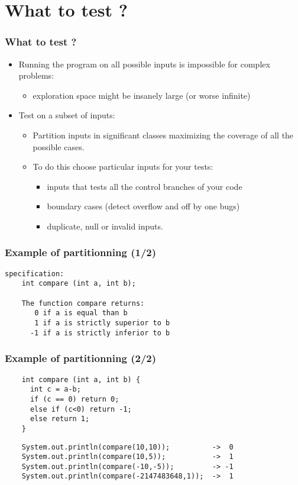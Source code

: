 \documentclass[10pt]{beamer}
\begin{document}
\section{What to test ?}
\begin{frame}
  \frametitle{What to test ?}
  \begin{itemize}
    \item Running the program on all possible inputs is impossible for complex
      problems:
      \begin{itemize}
      \item exploration space might be insanely large (or worse infinite)
      \end{itemize}
    \item Test on a subset of inputs:
      \begin{itemize}
      \item Partition inputs in significant classes maximizing the coverage of all the possible cases.
      \item To do this choose particular inputs for your tests:
        \begin{itemize}
          \item inputs that tests all the control branches of your code
          \item boundary cases (detect overflow and off by one bugs)
          \item duplicate, null or invalid inputs.
        \end{itemize}
      \end{itemize}
  \end{itemize}
\end{frame}

\begin{frame}[fragile]
  \frametitle{Example of partitionning (1/2)}
\begin{verbatim}
specification:
    int compare (int a, int b);

    The function compare returns:
       0 if a is equal than b
       1 if a is strictly superior to b
      -1 if a is strictly inferior to b
\end{verbatim}

\end{frame}

\begin{frame}[fragile]
  \frametitle{Example of partitionning (2/2)}
\begin{verbatim}
    int compare (int a, int b) {
      int c = a-b;
      if (c == 0) return 0;
      else if (c<0) return -1;
      else return 1;
    }
\end{verbatim}
\pause
\begin{verbatim}
    System.out.println(compare(10,10));          ->  0
    System.out.println(compare(10,5));           ->  1
    System.out.println(compare(-10,-5));         -> -1
    System.out.println(compare(-2147483648,1));  ->  1
\end{verbatim}
\end{frame}
\end{document}
